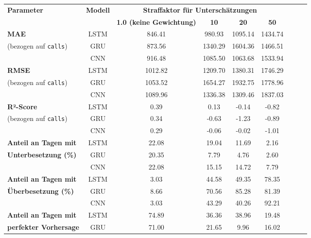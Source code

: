 \documentclass[%
pdftex,
oneside,			%
11pt,				%
parskip=half,		%
headheight = 12pt,	%
headsepline,		%
footsepline,		%
footheight = 16pt,	%
abstracton,		%
DIV=calc,		%
BCOR=8mm,		%
headinclude=false,	%
footinclude=false,	%
listof=totoc,		%
toc=bibliography,	%
]{scrreprt}	%
\begin{document}
        \begin{table}[H]
            \centering
            \begin{tabular}{|p{4cm}|c|c|c|c|c|c|c|c|}
            \hline
            \textbf{Parameter} & \textbf{Modell} & \multicolumn{4}{c|}{\textbf{Straffaktor für Unterschätzungen}} \\ \cline{3-6}
            & & \textbf{1.0 (keine Gewichtung)} & \textbf{10} & \textbf{20} & \textbf{50} \\ \hline
            \textbf{MAE} & LSTM & 846.41 & 980.93 & 1095.14 & 1434.74 \\ \cline{2-6}
            (bezogen auf \texttt{calls}) & GRU & 873.56 & 1340.29 & 1604.36 & 1466.51 \\ \cline{2-6}
            & CNN & 916.48 & 1085.50 & 1063.68 & 1533.94 \\ \hline
            \textbf{RMSE} & LSTM & 1012.82 & 1209.70 & 1380.31 & 1746.29 \\ \cline{2-6}
            (bezogen auf \texttt{calls}) & GRU & 1053.52 & 1654.27 & 1932.75 & 1778.96 \\ \cline{2-6}
            & CNN & 1089.96 & 1336.38 & 1309.46 & 1837.03 \\ \hline
            \textbf{R²-Score} & LSTM & 0.39 & 0.13 & -0.14 & -0.82 \\ \cline{2-6}
            (bezogen auf \texttt{calls}) & GRU & 0.34 & -0.63 & -1.23 & -0.89 \\ \cline{2-6}
            & CNN & 0.29 & -0.06 & -0.02 & -1.01 \\ \hline \hline
            \textbf{Anteil an Tagen mit} & LSTM & 22.08 & 19.04 & 11.69 & 2.16 \\ \cline{2-6}
            \textbf{Unterbesetzung (\%)}& GRU & 20.35 & 7.79 & 4.76 & 2.60 \\ \cline{2-6}
            & CNN & 22.08 & 15.15 & 14.72 & 7.79 \\ \hline
            \textbf{Anteil an Tagen mit} & LSTM & 3.03 & 44.58 & 49.35 & 78.35 \\ \cline{2-6}
            \textbf{Überbesetzung (\%)} & GRU & 8.66 & 70.56 & 85.28 & 81.39 \\ \cline{2-6}
            & CNN & 3.03 & 43.29 & 40.26 & 92.21 \\ \hline
            \textbf{Anteil an Tagen mit} & LSTM & 74.89 & 36.36 & 38.96 & 19.48 \\ \cline{2-6}
            \textbf{perfekter Vorhersage} & GRU & 71.00 & 21.65 & 9.96 & 16.02 \\ \cline{2-6}

\end{tabular}
\end{table}
\end{document}
